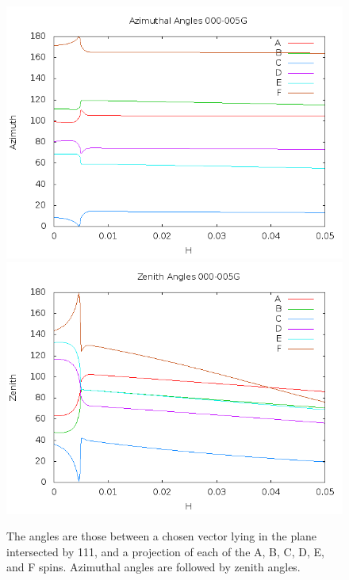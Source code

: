 \documentclass{article}
\begin{document}
\begin{figure}
\centering
\includegraphics[scale=0.5]{azim000to005G.png}
\includegraphics[scale=0.5]{zen000to005G.png}
\caption{The angles are those between a chosen vector lying in the plane intersected by 111,
and a projection of each of the A, B, C, D, E, and F spins. Azimuthal angles are followed by zenith angles.}
\end{figure}
\pagebreak
\end{document}
